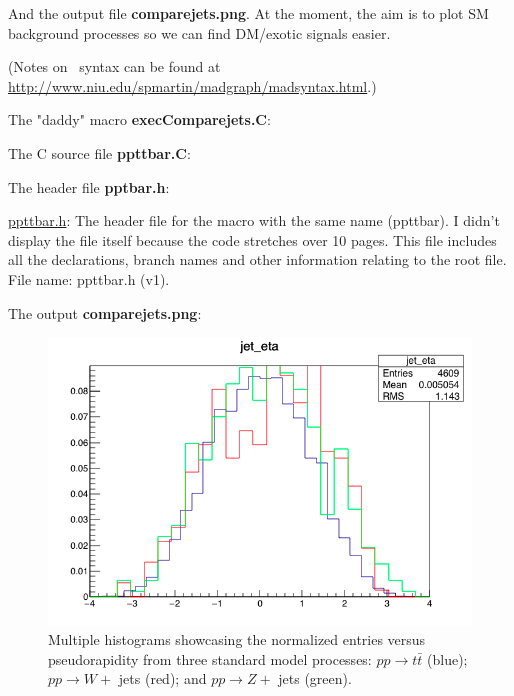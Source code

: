 And the output file \textbf{comparejets.png}. At the moment, the aim is to plot SM background processes so we can find DM/exotic signals easier.

(Notes on \madgraph\ syntax can be found at \url{http://www.niu.edu/spmartin/madgraph/madsyntax.html}.)

The "daddy" macro \textbf{execComparejets.C}:



The C source file \textbf{ppttbar.C}:



The header file \textbf{pptbar.h}:

\href{run:./sec11/ppttbarv1.h}{ppttbar.h}: The header file for the macro with the same name (ppttbar). I didn't display the file itself because the code stretches over 10 pages. This file includes all the declarations, branch names and other information relating to the root file. File name: ppttbar.h (v1).

The output \textbf{comparejets.png}:

\begin{figure}[H]
\centering
\includegraphics[width=\textwidth]{./sec11/comparejetsv1.png}
\caption{Multiple histograms showcasing the normalized entries versus pseudorapidity from three standard model processes: $pp \rightarrow t\bar{t}$ (blue); $pp \rightarrow W +$ jets (red); and $pp \rightarrow Z +$ jets (green).}
\end{figure}

